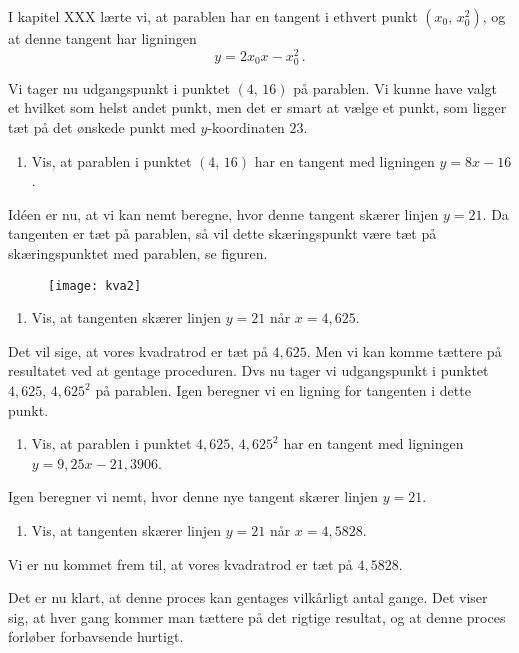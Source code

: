 \documentclass[12pt,oneside,a4paper]{article}
\theoremstyle{plain}
\begin{document}
I kapitel XXX lærte vi, at parablen har en tangent i ethvert punkt $(x_0,\,
x_0^2)$, og at denne tangent har ligningen
\[
    y=2x_0x - x_0^2 \,.
\]

Vi tager nu udgangspunkt i punktet $(4,\,16)$ på parablen. Vi kunne have valgt
et hvilket som helst andet punkt, men det er smart at vælge et punkt, som
ligger tæt på det ønskede punkt med $y$-koordinaten $23$.

\begin{enumerate}[label=(\alph*)]
    \item Vis, at parablen i punktet $(4,\,16)$ har en tangent med ligningen
        $y=8x-16$.
\end{enumerate}

Idéen er nu, at vi kan nemt beregne, hvor denne tangent skærer linjen $y=21$. 
Da tangenten er tæt på parablen, så vil dette skæringspunkt være tæt på 
skæringspunktet med parablen, se figuren.

\begin{figure}[ht]
    \centering
    \texttt{[image: kva2]}
    \caption{}
    \label{fig2}
\end{figure}

\begin{enumerate}[label=(\alph*), resume]
    \item Vis, at tangenten skærer linjen $y=21$ når $x=4,625$.
\end{enumerate}

Det vil sige, at vores kvadratrod er tæt på $4,625$. Men vi kan
komme tættere på resultatet ved at gentage proceduren. Dvs nu tager vi
udgangspunkt i punktet $4,625,\,4,625^2$ på parablen. Igen beregner vi en ligning for tangenten i dette punkt.

\begin{enumerate}[label=(\alph*), resume]
    \item Vis, at parablen i punktet $4,625,\,4,625^2$ har en tangent med
        ligningen $y=9,25x-21,3906$.
\end{enumerate}
Igen beregner vi nemt, hvor denne nye tangent skærer linjen $y=21$.

\begin{enumerate}[label=(\alph*), resume]
    \item Vis, at tangenten skærer linjen $y=21$ når $x=4,5828$.
\end{enumerate}

Vi er nu kommet frem til, at vores kvadratrod er tæt på $4,5828$.

Det er nu klart, at denne proces kan gentages vilkårligt antal gange.
Det viser sig, at hver gang kommer man tættere på det rigtige resultat, og
at denne proces forløber forbavsende hurtigt.
\end{document}
